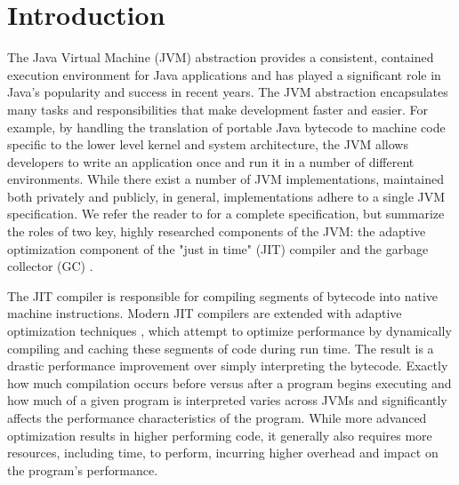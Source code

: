 \documentclass{sig-alternate}
\begin{document}



\section{Introduction}
\label{sec:introduction}

The Java Virtual Machine (JVM) abstraction provides a consistent, contained execution environment for Java applications and has played a significant role in Java's popularity and success in recent years. The JVM abstraction encapsulates many tasks and responsibilities that make development faster and easier. For example, by handling the translation of portable Java bytecode to machine code specific to the lower level kernel and system architecture, the JVM allows developers to write an application once and run it in a number of different environments. While there exist a number of JVM implementations, maintained both privately and publicly, in general, implementations adhere to a single JVM specification. We refer the reader to \cite{lindholm2014java} for a complete specification, but summarize the roles of two key, highly researched components of the JVM: the adaptive optimization component of the "just in time" (JIT) compiler and the garbage collector (GC) \cite{hotspot:whitepaper}.

The JIT compiler is responsible for compiling segments of bytecode into native machine instructions. Modern JIT compilers are extended with adaptive optimization techniques \cite{suganuma2001dynamic}, which attempt to optimize performance by dynamically compiling and caching these segments of code during run time. The result is a drastic performance improvement over simply interpreting the bytecode. Exactly how much compilation occurs before versus after a program begins executing and how much of a given program is interpreted varies across JVMs and significantly affects the performance characteristics of the program. While more advanced optimization results in higher performing code, it generally also requires more resources, including time, to perform, incurring higher overhead and impact on the program's performance.
\end{document}
